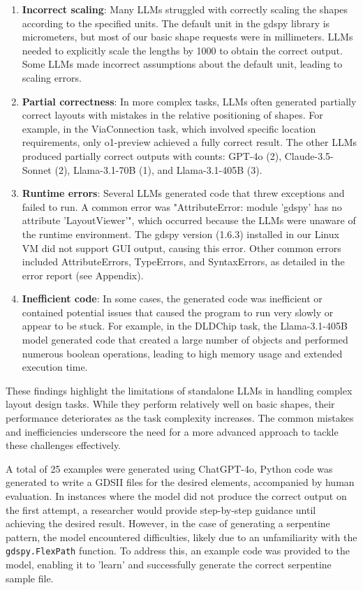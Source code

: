 \documentclass{article}
\begin{document}
\begin{enumerate}
  \item \textbf{Incorrect scaling}: Many LLMs struggled with correctly scaling the shapes according to the specified units. The default unit in the gdspy library is micrometers, but most of our basic shape requests were in millimeters. LLMs needed to explicitly scale the lengths by 1000 to obtain the correct output. Some LLMs made incorrect assumptions about the default unit, leading to scaling errors.
  
  \item \textbf{Partial correctness}: In more complex tasks, LLMs often generated partially correct layouts with mistakes in the relative positioning of shapes. For example, in the ViaConnection task, which involved specific location requirements, only o1-preview achieved a fully correct result. The other LLMs produced partially correct outputs with counts: GPT-4o (2), Claude-3.5-Sonnet (2), Llama-3.1-70B (1), and Llama-3.1-405B (3).
  
  \item \textbf{Runtime errors}: Several LLMs generated code that threw exceptions and failed to run. A common error was "AttributeError: module 'gdspy' has no attribute 'LayoutViewer'", which occurred because the LLMs were unaware of the runtime environment. The gdspy version (1.6.3) installed in our Linux VM did not support GUI output, causing this error. Other common errors included AttributeErrors, TypeErrors, and SyntaxErrors, as detailed in the error report (see Appendix).
  
  \item \textbf{Inefficient code}: In some cases, the generated code was inefficient or contained potential issues that caused the program to run very slowly or appear to be stuck. For example, in the DLDChip task, the Llama-3.1-405B model generated code that created a large number of objects and performed numerous boolean operations, leading to high memory usage and extended execution time.
\end{enumerate}

These findings highlight the limitations of standalone LLMs in handling complex layout design tasks. While they perform relatively well on basic shapes, their performance deteriorates as the task complexity increases. The common mistakes and inefficiencies underscore the need for a more advanced approach to tackle these challenges effectively.

A total of 25 examples were generated using ChatGPT-4o, Python code was generated to write a GDSII files for the desired elements, accompanied by human evaluation. In instances where the model did not produce the correct output on the first attempt, a researcher would provide step-by-step guidance until achieving the desired result. However, in the case of generating a serpentine pattern, the model encountered difficulties, likely due to an unfamiliarity with the \texttt{gdspy.FlexPath} function. To address this, an example code was provided to the model, enabling it to 'learn' and successfully generate the correct serpentine sample file.
\end{document}
